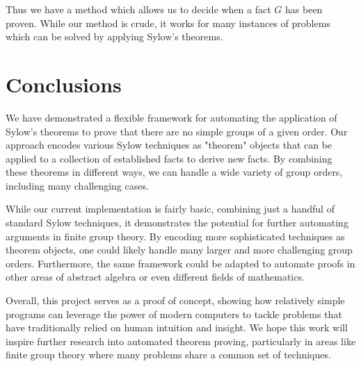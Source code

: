 \documentclass[11pt,
oneside]{article} %
\begin{document}
Thus we have a method which allows us to decide when a fact $G$ has
been proven.  While our method is crude, it works for many instances
of problems which can be solved by applying Sylow's theorems.

\section{Conclusions}

We have demonstrated a flexible framework for automating the
application of Sylow's theorems to prove that there are no simple
groups of a given order. Our approach encodes various Sylow techniques
as "theorem" objects that can be applied to a collection of
established facts to derive new facts. By combining these theorems in
different ways, we can handle a wide variety of group orders,
including many challenging cases.

While our current implementation is fairly basic, combining just a
handful of standard Sylow techniques, it demonstrates the potential
for further automating arguments in finite group theory. By encoding
more sophisticated techniques as theorem objects, one could likely
handle many larger and more challenging group orders. Furthermore, the
same framework could be adapted to automate proofs in other areas of
abstract algebra or even different fields of mathematics.

Overall, this project serves as a proof of concept, showing how
relatively simple programs can leverage the power of modern computers
to tackle problems that have traditionally relied on human intuition
and insight. We hope this work will inspire further research into
automated theorem proving, particularly in areas like finite group
theory where many problems share a common set of techniques.
\end{document}
